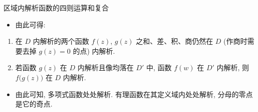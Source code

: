 \begin{frame}{区域内解析函数的四则运算和复合}
	\begin{itemize}
		\item 由此可得:
	\end{itemize}
	\onslide<+->
	\begin{theorem}
		\begin{enumerate}
			\item 在 $D$ 内解析的两个函数 $f(z)$, $g(z)$ 之和、差、积、商仍然在 $D$ (作商时需要去掉 $g(z)=0$ 的点) 内解析.
			\item 若函数 $g(z)$ 在 $D$ 内解析且像均落在 $D'$ 中, 函数 $f(w)$ 在 $D'$ 内解析, 则 $f\bigl(g(z)\bigr)$ 在 $D$ 内解析.
		\end{enumerate}
	\end{theorem}
	\begin{itemize}
		\item 由此可知, 多项式函数处处解析. 有理函数在其定义域内处处解析, 分母的零点是它的奇点.
	\end{itemize}
\end{frame}


